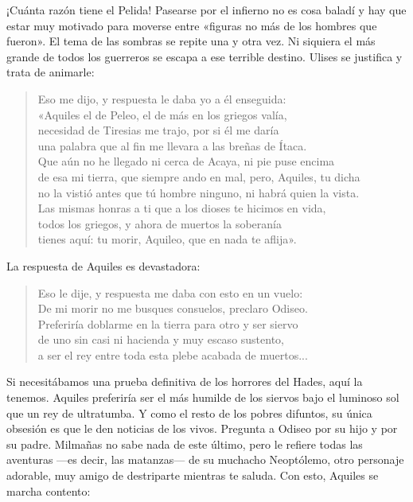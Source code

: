 ¡Cuánta razón tiene el Pelida! Pasearse por el infierno no es cosa baladí y hay que estar muy motivado para moverse entre «figuras no más de los hombres que fueron». El tema de las sombras se repite una y otra vez. Ni siquiera el más grande de todos los guerreros se escapa a ese terrible destino. Ulises se justifica y trata de animarle:


\begin{verse}
Eso me dijo, y respuesta le daba yo a él enseguida:\\
«Aquiles el de Peleo, el de más en los griegos valía,\\
necesidad de Tiresias me trajo, por si él me daría\\
una palabra que al fin me llevara a las breñas de Ítaca.\\
Que aún no he llegado ni cerca de Acaya, ni pie puse encima\\
de esa mi tierra, que siempre ando en mal, pero, Aquiles, tu dicha\\
no la vistió antes que tú hombre ninguno, ni habrá quien la vista.\\
Las mismas honras a ti que a los dioses te hicimos en vida,\\
todos los griegos, y ahora de muertos la soberanía\\
tienes aquí: tu morir, Aquileo, que en nada te aflija».
\end{verse}

La respuesta de Aquiles es devastadora:

\begin{verse}
Eso le dije, y respuesta me daba con esto en un vuelo:\\
De mi morir no me busques consuelos, preclaro Odiseo.\\
Preferiría doblarme en la tierra para otro y ser siervo\\
de uno sin casi ni hacienda y muy escaso sustento,\\
a ser el rey entre toda esta plebe acabada de muertos...
\end{verse}

Si necesitábamos una prueba definitiva de los horrores del Hades, aquí la tenemos. Aquiles preferiría ser el más humilde de los siervos bajo el luminoso sol que un rey de ultratumba. Y como el resto de los pobres difuntos, su única obsesión es que le den noticias de los vivos. Pregunta a Odiseo por su hijo y por su padre. Milmañas no sabe nada de este último, pero le refiere todas las aventuras ---es decir, las matanzas--- de su muchacho Neoptólemo, otro personaje adorable, muy amigo de destriparte mientras te saluda. Con esto, Aquiles se marcha contento:

